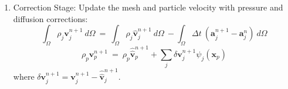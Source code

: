 \begin{enumerate}
 \item Correction Stage: Update the mesh and particle velocity with pressure and diffusion corrections:
 \begin{equation}\label{Step6a}
  \int_{\Omega} \rho_j \mathbf{v}_j^{n+1}\ d\Omega \ = \ \int_{\Omega} \rho_j  \widehat{\mathbf{v}}_j^{n+1}\ d\Omega\ - \int_{\Omega} \Delta t \ (\mathbf{a}_j^{n+1} - \mathbf{a}_j^{n})\ d\Omega
 \end{equation}
  \begin{equation}\label{Step6b}
  \rho_p \mathbf{v}_p^{n+1}\  = \ \rho_p \widehat{\widehat{\mathbf{v}}}_p^{n+1} + \sum_{j} \delta \mathbf{v}_j^{n+1} \psi_j(\mathbf{x}_{p})
  \end{equation}
  where $\delta \mathbf{v}_j^{n+1} = \mathbf{v}_j^{n+1}-\widehat{\widehat{\mathbf{v}}}_j^{n+1}$.

\end{enumerate} 